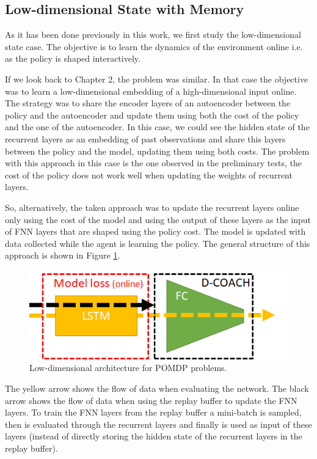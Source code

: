 \subsection{Low-dimensional State with Memory}
As it has been done previously in this work, we first study the low-dimensional state case. The objective is to learn the dynamics of the environment online i.e. as the policy is shaped interactively. 

If we look back to Chapter 2, the problem was similar. In that case the objective was to learn a low-dimensional embedding of a high-dimensional input online. The strategy was to share the encoder layers of an autoencoder between the policy and the autoencoder and update them using both the cost of the policy and the one of the autoencoder. In this case, we could see the hidden state of the recurrent layers as an embedding of past observations and share this layers between the policy and the model, updating them using both costs. The problem with this approach in this case is the one observed in the preliminary tests, the cost of the policy does not work well when updating the weights of recurrent layers.  

So, alternatively, the taken approach was to update the recurrent layers online only using the cost of the model and using the output of these layers as the input of FNN layers that are shaped using the policy cost. The model is updated with data collected while the agent is learning the policy. The general structure of this approach is shown in Figure \ref{fig:rnn_ld}.

\begin{figure}[h]
    \centering
    \includegraphics[width=0.5\linewidth]{imagenes/cap4/RNN_LD.png}
    \caption{Low-dimensional architecture for POMDP problems.}
    \label{fig:rnn_ld}
\end{figure}

The yellow arrow shows the flow of data when evaluating the network. The black arrow shows the flow of data when using the replay buffer to update the FNN layers. To train the FNN layers from the replay buffer a mini-batch is sampled, then is evaluated through the recurrent layers and finally is used as input of these layers (instead of directly storing the hidden state of the recurrent layers in the replay buffer).

